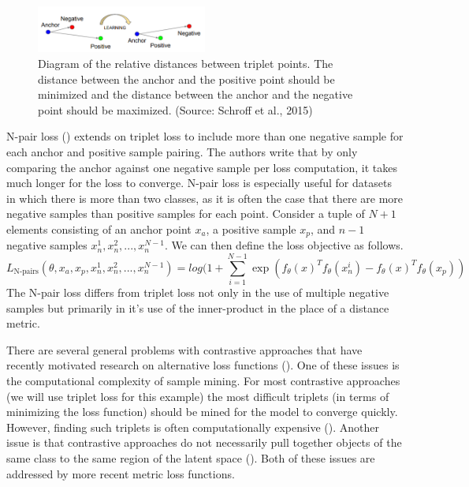 \documentclass[./dissertation.tex]{subfiles}
\begin{document}
    \begin{figure}[h]
        \centering\includegraphics[width=0.5\textwidth]{figures/triplet_loss_figure}
        \caption{Diagram of the relative distances between triplet points. The distance between the anchor and the positive point should be minimized and the distance between the anchor and the negative point should be maximized. (Source: Schroff et al., 2015)}
        \label{Triplet Loss Diagram}
    \end{figure}
    
    N-pair loss (\cite{sohn2016improved}) extends on triplet loss to include more than one negative sample for each anchor and positive sample pairing. The authors write that by only comparing the anchor against one negative sample per loss computation, it takes much longer for the loss to converge. N-pair loss is especially useful for datasets in which there is more than two classes, as it is often the case that there are more negative samples than positive samples for each point. Consider a tuple of $N + 1$ elements consisting of an anchor point $x_{a}$, a positive sample $x_{p}$, and $n - 1$ negative samples $x_{n}^{1}, x_{n}^{2}, ..., x_{n}^{N - 1}$. We can then define the loss objective as follows.
    \begin{equation*}
    L_{\text{N-pairs}}(\theta, x_{a}, x_{p}, x_{n}^{1}, x_{n}^{2}, ..., x_{n}^{N - 1}) = log(1 + \sum_{i=1}^{N-1} 
    \exp(f_{\theta}(x)^{T} f_{\theta}(x_{n}^{i}) 
    - f_{\theta}(x)^{T} f_{\theta}(x_{p})
    )
    \end{equation*} 
    The N-pair loss differs from triplet loss not only in the use of multiple negative samples but primarily in it's use of the inner-product in the place of a distance metric.
    
    There are several general problems with contrastive approaches that have recently motivated research on alternative loss functions (\cite{hav4ik2021deepmetriclearning}). One of these issues is the computational complexity of sample mining. For most contrastive approaches (we will use triplet loss for this example) the most difficult triplets (in terms of minimizing the loss function) should be mined for the model to converge quickly. However, finding such triplets is often computationally expensive (\cite{hav4ik2021deepmetriclearning}). Another issue is that contrastive approaches  do not necessarily pull together objects of the same class to the same region of the latent space (\cite{hav4ik2021deepmetriclearning}). Both of these issues are addressed by more recent metric loss functions.
    
\end{document}
